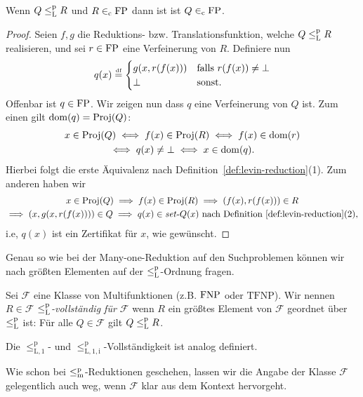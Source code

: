 \begin{lemma}
    Wenn $Q\leq_\mathrm{L}^\mathrm{p} R$ und $R\in_\mathrm{c}\mathrm{FP}$ dann ist ist $Q\in_\mathrm{c} \mathrm{FP}$.
\end{lemma}
\begin{proof}
    Seien $f,g$ die Reduktions- bzw. Translationsfunktion, welche $Q\leq_\mathrm{L}^\mathrm{p} R$ realisieren, und sei $r\in\mathrm{FP}$ eine Verfeinerung von $R$.
    Definiere nun
    \[ q(x) \stackrel{\text{\smash{\tiny df}}}{=} \begin{cases} g(x, r(f(x))) & \text{falls $r(f(x))\neq \bot$} \\ \bot & \text{sonst}.\end{cases} \]
    Offenbar ist $q\in\mathrm{FP}$. Wir zeigen nun dass $q$ eine Verfeinerung von $Q$ ist.
    Zum einen gilt $\operatorname{dom}(q)=\operatorname{Proj}(Q)$:
    \begin{gather*} x\in\operatorname{Proj}(Q) \iff f(x)\in\operatorname{Proj}(R) \iff f(x)\in\operatorname{dom}(r) \\
    \iff q(x)\neq\bot \iff x\in\operatorname{dom}(q). \end{gather*}
    Hierbei folgt die erste Äquivalenz nach Definition~\ref{def:levin-reduction}(1).
    Zum anderen haben wir
    \begin{gather*}
        x\in\operatorname{Proj}(Q) \implies f(x)\in\operatorname{Proj}(R) \implies (f(x), r(f(x)))\in R\\ \implies (x, g(x, r(f(x))))\in Q \implies q(x)\in\mathit{set}\text{-}{}Q(x) \text{ nach Definition~\ref{def:levin-reduction}(2)},
    \end{gather*}
    i.e, $q(x)$ ist ein Zertifikat für $x$, wie gewünscht.
\end{proof}

Genau so wie bei der Many-one-Reduktion auf den Suchproblemen können wir nach größten Elementen auf der $\leq_\mathrm{L}^\mathrm{p}$-Ordnung fragen.

\begin{definition}
    Sei $\mathcal F$ eine Klasse von Multifunktionen (z.B. $\mathrm{FNP}$ oder $\mathrm{TFNP}$).
    Wir nennen $R\in\mathcal F$ \emph{$\leq_\mathrm{L}^\mathrm{p}$-vollständig für $\mathcal F$} wenn $R$ ein größtes Element von $\mathcal F$ geordnet über $\leq_\mathrm{L}^\mathrm{p}$ ist:
    Für alle $Q\in\mathcal F$ gilt $Q\leq_\mathrm{L}^\mathrm{p} R$.

    Die $\leq_\mathrm{L,1}^\mathrm p$- und $\leq_\mathrm{L,1,i}^\mathrm p$-Vollständigkeit ist analog definiert.
\end{definition}
Wie schon bei $\leq_\mathrm{m}^\mathrm{p}$-Reduktionen geschehen, lassen wir die Angabe der Klasse $\mathcal F$ gelegentlich auch weg, wenn $\mathcal F$ klar aus dem Kontext hervorgeht.

